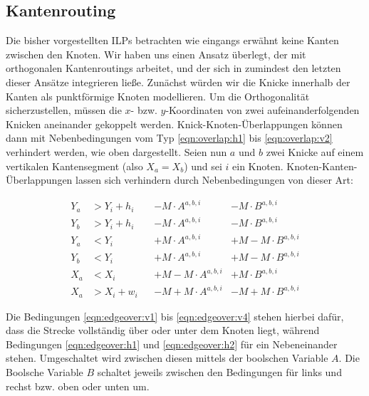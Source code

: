 \subsection{Kantenrouting}
\label{sub:edgeroute}

Die bisher vorgestellten ILPs betrachten wie eingangs erwähnt keine Kanten zwischen den Knoten. Wir haben uns einen Ansatz überlegt, der mit orthogonalen Kantenroutings arbeitet, und der sich in zumindest den letzten dieser Ansätze integrieren ließe. Zunächst würden wir die Knicke innerhalb der Kanten als punktförmige Knoten modellieren. Um die Orthogonalität sicherzustellen, müssen die $x$- bzw. $y$-Koordinaten von zwei aufeinanderfolgenden Knicken aneinander gekoppelt werden. Knick-Knoten-Überlappungen können dann mit Nebenbedingungen vom Typ \ref{eqn:overlap:h1} bis \ref{eqn:overlap:v2} verhindert werden, wie oben dargestellt. Seien nun $a$ und $b$ zwei Knicke auf einem vertikalen Kantensegment (also $X_a = X_b$) und sei $i$ ein Knoten. Knoten-Kanten-Überlappungen lassen sich verhindern durch Nebenbedingungen von dieser Art:

\begin{align}
	Y_a &> Y_{i} + h_i &&- M \cdot A^{a,b,i} & - M \cdot B^{a,b,i} \label{eqn:edgeover:v1} \\
	Y_b &> Y_{i} + h_i &&- M \cdot A^{a,b,i} & - M \cdot B^{a,b,i} \label{eqn:edgeover:v2}\\
	Y_a &< Y_{i}  &&+ M \cdot A^{a,b,i} & + M - M \cdot B^{a,b,i} \label{eqn:edgeover:v3}\\
	Y_b &< Y_{i}  &&+ M \cdot A^{a,b,i} & + M - M \cdot B^{a,b,i} \label{eqn:edgeover:v4}\\
	X_a &< X_i &&+ M - M \cdot A^{a,b,i} & + M \cdot B^{a,b,i} \label{eqn:edgeover:h1}\\
	X_a &> X_i + w_i &&- M + M \cdot A^{a,b,i} & -M + M \cdot B^{a,b,i} \label{eqn:edgeover:h2}
\end{align}

Die Bedingungen \ref{eqn:edgeover:v1} bis \ref{eqn:edgeover:v4} stehen hierbei dafür, dass die Strecke vollständig über oder unter dem Knoten liegt, während Bedingungen \ref{eqn:edgeover:h1} und \ref{eqn:edgeover:h2} für ein Nebeneinander stehen. Umgeschaltet wird zwischen diesen mittels der boolschen Variable $A$. Die Boolsche Variable $B$ schaltet jeweils zwischen den Bedingungen für links und rechst bzw. oben oder unten um.

